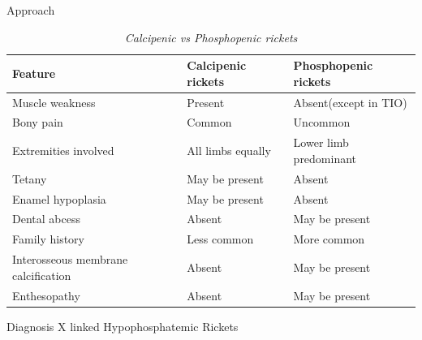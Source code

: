 \documentclass[compress]{beamer}
\newcommand{\myred}[1]{\textcolor{red!60!black}{#1}}
\begin{document}
\begin{frame}[shrink]{Approach  }
\begin{table}[h]
	\centering
	\caption{\textit{Calcipenic vs Phosphopenic rickets}}
	\begin{tabular}{@{}lp{3.5cm}l@{}}
		\toprule
		Feature                             & Calcipenic rickets & Phosphopenic rickets   \\ \midrule
		Muscle weakness                     & Present            & Absent(except in TIO)  \\
		Bony pain                           & Common             & Uncommon               \\
		Extremities involved                & All limbs equally  & \myred{Lower limb predominant} \\
		Tetany                              & May be present     & Absent                 \\
		Enamel hypoplasia                   & May be present     & Absent                 \\
		Dental abcess                       & Absent             & \myred{May be present}         \\
		Family history                      & Less common        &  \myred{ More common}           \\
		Interosseous membrane calcification & Absent             & \myred{May be present}         \\
		Enthesopathy                        & Absent             & \myred{May be present }        \\ \bottomrule
	\end{tabular}
\end{table}
\end{frame} 
\begin{frame}{Diagnosis  }
	\center X linked Hypophosphatemic Rickets
\end{frame} 
\end{document}
